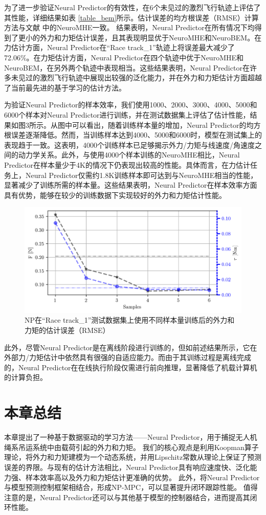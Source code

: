 \documentclass[lang=chs, degree=master, blindreview=false, winfonts=true]{yanputhesis}
\begin{document}
为了进一步验证Neural Predictor的有效性，在6个未见过的激烈飞行轨迹上评估了其性能，详细结果如表 \ref{table_bem}所示。估计误差的均方根误差（RMSE）计算方法与文献 \cite{Wang2024e} 中的NeuroMHE一致。
结果表明，Neural Predictor在所有情况下均得到了更小的外力和力矩估计误差，且其表现明显优于NeuroMHE和NeuroBEM。在力估计方面，Neural Predictor在“Race track\_1”轨迹上将误差最大减少了72.06\%。在力矩估计方面，Neural Predictor在四个轨迹中优于NeuroMHE和NeuroBEM，在另外两个轨迹中表现相当。这些结果表明，Neural Predictor在许多未见过的激烈飞行轨迹中展现出较强的泛化能力，并在外力和力矩估计方面超越了当前最先进的基于学习的估计方法。

为验证Neural Predictor的样本效率，我们使用1000、2000、3000、4000、5000和6000个样本对Neural Predictor进行训练，并在测试数据集上评估了估计性能，结果如图3所示。从图中可以看出，随着训练样本量的增加，Neural Predictor的均方根误差逐渐降低。然而，当训练样本达到4000、5000和6000时，模型在测试集上的表现趋于一致。这表明，4000个训练样本已足够揭示外力/力矩与线速度/角速度之间的动力学关系。此外，与使用4000个样本训练的NeuroMHE相比，Neural Predictor在样本量少于4K的情况下仍表现出较高的性能。具体而言，在力估计任务上，Neural Predictor仅需约1.8K训练样本即可达到与NeuroMHE相当的性能，显著减少了训练所需的样本量。这些结果表明，Neural Predictor在样本效率方面具有优势，能够在较少的训练数据下实现较好的外力和力矩估计性能。
\begin{figure}[hbt!]
	\centering
	\includegraphics[width=38pc]{picture/kk/sample_efficiency.png} 
	\caption{NP在“Race track\_1”测试数据集上使用不同样本量训练后的外力和力矩的估计误差（RMSE）} 
	\label{3-6}
\end{figure}
此外，尽管Neural Predictor是在离线阶段进行训练的，但如前述结果所示，它在外部力/力矩估计中依然具有很强的自适应能力。而由于其训练过程是离线完成的，Neural Predictor在在线执行阶段仅需进行前向推理，显著降低了机载计算机的计算负担。

\section{本章总结}
本章提出了一种基于数据驱动的学习方法——Neural Predictor，用于捕捉无人机绳系吊运系统中由载荷引起的外力和力矩。 我们的核心观点是利用Koopman算子理论，将外力和力矩建模为一个动态系统，并用Lipschitz常数从理论上保证了预测误差的界限。与现有的估计方法相比，Neural Predictor具有响应速度快、泛化能力强、样本效率高以及外力和力矩估计更准确的优势。 此外，将Neural Predictor与模型预测控制框架相结合，形成NP-MPC，可以显著提升闭环跟踪性能。 值得注意的是，Neural Predictor还可以与其他基于模型的控制器结合，进而提高其闭环性能。
\end{document}
